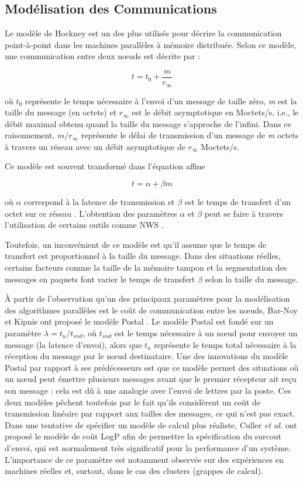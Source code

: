 \subsection{Modélisation des Communications}

Le modèle de Hockney \cite{Hockney94} est un des plus utilisés pour
décrire la communication point-à-point dans les machines parallèles
à mémoire distribuée. Selon ce modèle, une communication entre deux
n{\oe}uds est décrite par : 

\[
t=t_{0}+\frac{m}{r_{\infty}}\]


où $t_{0}$ représente le temps nécessaire à l'envoi d'un message
de taille zéro, \emph{m} est la taille du message (en octets) et $r_{\infty}$
est le débit asymptotique en Moctets/s, i.e., le débit maximal obtenu
quand la taille du message s'approche de l'infini. Dans ce raisonnement,
$m/r_{\infty}$ représente le délai de transmission d'un message de
\emph{m} octets à travers un réseau avec un débit asymptotique de
$r_{\infty}$ Moctets/s.

Ce modèle est souvent transformé dans l'équation affine 

\[
t=\alpha+\beta m\]


où $\alpha$ correspond à la latence de transmission et $\beta$ est
le temps de transfert d'un octet sur ce réseau \cite{Pjesivac-Grbovic05}.
L'obtention des paramètres $\alpha$ et $\beta$ peut se faire à travers
l'utilisation de certains outils comme NWS \cite{Wolski97}. 

Toutefois, un inconvénient de ce modèle est qu'il assume que le temps
de transfert est proportionnel à la taille du message. Dans des situations
réelles, certains facteurs comme la taille de la mémoire tampon et
la segmentation des messages en paquets font varier le temps de transfert
$\beta$ selon la taille du message. 

À partir de l'observation qu'un des principaux paramètres pour la
modélisation des algorithmes parallèles est le coût de communication
entre les n{\oe}uds, Bar-Noy et Kipnis ont proposé le modèle Postal
\cite{Bar-Noy94}. Le modèle Postal est fondé sur un paramètre $\lambda=t_{u}/t_{snd}$,
où $t_{snd}$ est le temps nécessaire à un n{\oe}ud pour envoyer
un message (la latence d'envoi), alors que $t_{u}$ représente le
temps total nécessaire à la réception du message par le n{\oe}ud
destinataire. Une des innovations du modèle Postal par rapport à ses
prédécesseurs est que ce modèle permet des situations où un n{\oe}ud
peut émettre plusieurs messages avant que le premier récepteur ait reçu
son message : cela est dû à une analogie avec l'envoi de lettres par
la poste. Ces deux modèles pêchent toutefois par le fait qu'ils considèrent un coût de transmission linéaire par rapport aux tailles des messages, ce qui n'est pas exact. 
%
Dans une tentative de spécifier un modèle de calcul plus réaliste,
Culler \emph{et al.} \cite{Culler96} ont proposé le modèle de coût
LogP afin de permettre la spécification du surcout d'envoi, qui
est normalement très significatif pour la performance d'un système.
L'importance de ce paramètre est notamment observée sur des expériences
en machines réelles et, surtout, dans le cas des clusters (grappes de calcul). 

